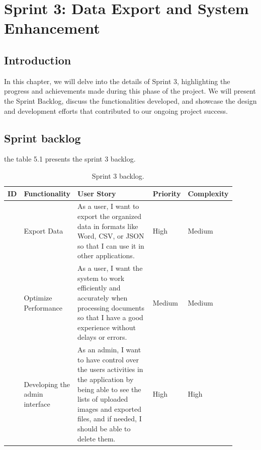 %
\chapter{Sprint 3: Data Export and System Enhancement}
\label{ch::chapter6}

\section{Introduction}

In this chapter, we will delve into the details of Sprint 3, highlighting the progress and achievements made during this phase of the project. We will present the Sprint Backlog, discuss the functionalities developed, and showcase the design and development efforts that contributed to our ongoing project success.

\section{Sprint backlog}
the table 5.1 presents the sprint 3 backlog.
\begin{table}[!htpb]
    \caption{Sprint 3 backlog.}
    \centering
    \begin{tabular}{|>{\centering\arraybackslash}m{0.05\linewidth}|>{\centering\arraybackslash}m{0.15\linewidth}|>{\centering\arraybackslash}m{0.45\linewidth}|>{\centering\arraybackslash}m{0.1\linewidth}|>{\centering\arraybackslash}m{0.15\linewidth}|} \hline 
    \textbf{ID} & \textbf{Functionality} & \textbf{User Story} & \textbf{Priority} & \textbf{Complexity} \\ \hline
         1 & Export Data & As a user, I want to export the organized data in formats like Word, CSV, or JSON so that I can use it in other applications. & High & Medium\\ \hline
         2 & Optimize Performance & As a user, I want the system to work efficiently and accurately when processing documents so that I have a good experience without delays or errors. & Medium & Medium\\ \hline
         3 & Developing the admin interface & As an admin, I want to have control over the users activities in the application by being able to see the lists of uploaded images and exported files, and if needed, I should be able to delete them. & High & High\\ \hline
    \end{tabular}
    
    \label{tab:sprint3_backlog}
\end{table}

